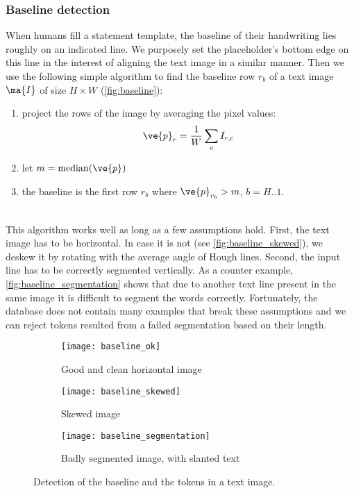
		\subsubsection*{Baseline detection}
			When humans fill a statement template, the baseline of their handwriting lies roughly on an indicated line.  We purposely set the placeholder's bottom edge on this line in the interest of aligning the text image in a similar manner. Then we use the following simple algorithm to find the baseline row \(r_b\) of a text image \(\ma{I}\) of size \(H \times W\) (\autoref{fig:baseline}):
			\noindent\begin{minipage}{\linewidth}
			\begin{enumerate}
				\item project the rows of the image by averaging the pixel values: \[
					\ve{p}_r = \frac{1}{W} \sum_c I_{r,c}
				\]
				\item let \(m = \operatorname{median}(\ve{p})\)
				\item the baseline is the first row \(r_b\) where \(\ve{p}_{r_b} > m\), \(b = H..1\).
			\end{enumerate}
			\end{minipage}\\

			This algorithm works well as long as a few assumptions hold. First, the text image has to be horizontal. In case it is not (see \autoref{fig:baseline_skewed}), we deskew it by rotating with the average angle of Hough lines. Second, the input line has to be correctly segmented vertically. As a counter example, \autoref{fig:baseline_segmentation} shows that due to another text line present in the same image it is difficult to segment the words correctly. Fortunately, the database does not contain many examples that break these assumptions and we can reject tokens resulted from a failed segmentation based on their length.

			\begin{figure}
				\begin{subfigure}{\linewidth}
					\texttt{[image: baseline\_ok]}
					\caption{Good and clean horizontal image}
					\label{fig:baseline_ok}
				\end{subfigure}

				\begin{subfigure}{\linewidth}
					\texttt{[image: baseline\_skewed]}
					\caption{Skewed image}
					\label{fig:baseline_skewed}
				\end{subfigure}

				\begin{subfigure}{\linewidth}
					\texttt{[image: baseline\_segmentation]}
					\caption{Badly segmented image, with slanted text}
					\label{fig:baseline_segmentation}
				\end{subfigure}
				\caption[Baseline and tokens]{Detection of the baseline and the tokens in a text image.}
				\label{fig:baseline}
			\end{figure}

